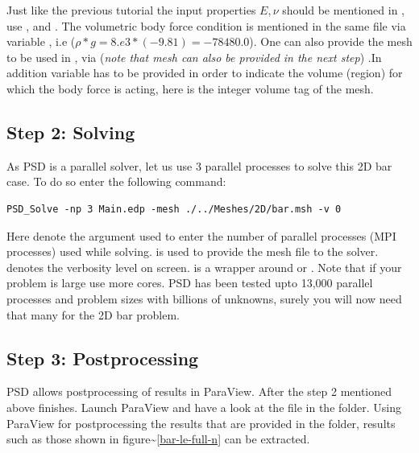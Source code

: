 Just like the previous tutorial the input properties \(E,\nu\) should be
mentioned in , use , and
. The volumetric body force condition is mentioned in the
same file via variable , i.e
(\(\rho*g=8.e3*(-9.81)=-78480.0\)). One can also provide the mesh to be
used in  , via
(\textit{note that mesh can also be provided in the next step}) .In
addition variable  has to be provided in order to indicate
the volume (region) for which the body force is acting, here  is
the integer volume tag of the mesh.

\subsection{Step 2: Solving}

As PSD is a parallel solver, let us use 3 parallel processes to solve
this 2D bar case. To do so enter the following command:

\begin{lstlisting}[style=BashInputStyle]
PSD_Solve -np 3 Main.edp -mesh ./../Meshes/2D/bar.msh -v 0
\end{lstlisting}

Here  denote the argument used to enter the number of
parallel processes (MPI processes) used while solving.
 is used to provide the mesh file to
the solver.  denotes the verbosity level on
screen. is a wrapper around  or
. Note that if your problem is large use more cores.
PSD has been tested upto 13,000 parallel processes and problem sizes
with billions of unknowns, surely you will now need that many for the 2D
bar problem.

\subsection{Step 3: Postprocessing}

PSD allows postprocessing of results in ParaView. After the step 2
mentioned above finishes. Launch ParaView and have a look at the
 file in the  folder. Using ParaView for
postprocessing the results that are provided in the 
folder, results such as those shown in
figure\textasciitilde{}\ref{bar-le-full-n} can be extracted.

